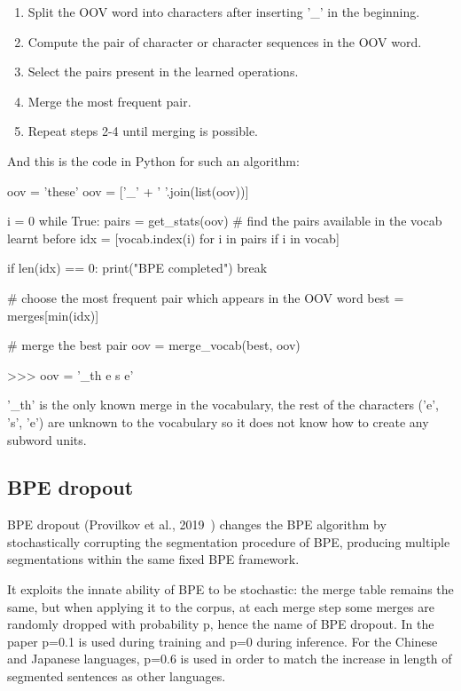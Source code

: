 \begin{enumerate}
    \item Split the OOV word into characters after inserting '\_' in the beginning.
    \item Compute the pair of character or character sequences in the OOV word.
    \item Select the pairs present in the learned operations.
    \item Merge the most frequent pair.
    \item Repeat steps 2-4 until merging is possible.
\end{enumerate}

And this is the code in Python for such an algorithm:

\begin{python}
oov = 'these'
oov = ['_' + ' '.join(list(oov))]

i = 0
while True:
    pairs = get_stats(oov)
    # find the pairs available in the vocab learnt before
    idx = [vocab.index(i) for i in pairs if i in vocab]

    if len(idx) == 0:
        print("BPE completed")
        break

    # choose the most frequent pair which appears in the OOV word
    best = merges[min(idx)]

    # merge the best pair
    oov = merge_vocab(best, oov)

>>> oov = '_th e s e'
\end{python}

'\_th' is the only known merge in the vocabulary, the rest of the characters ('e', 's', 'e') are unknown to the vocabulary so it does not know how to create any subword units.

\subsection{BPE dropout}

BPE dropout (Provilkov et al., 2019~\cite{provilkov2019bpedropout}) changes the BPE algorithm by stochastically corrupting the segmentation procedure of BPE, producing multiple segmentations within the same fixed BPE framework.

It exploits the innate ability of BPE to be stochastic: the merge table remains the same, but when applying it to the corpus, at each merge step some merges are randomly dropped with probability p, hence the name of BPE dropout. In the paper p=0.1 is used during training and p=0 during inference. For the Chinese and Japanese languages, p=0.6 is used in order to match the increase in length of segmented sentences as other languages.

